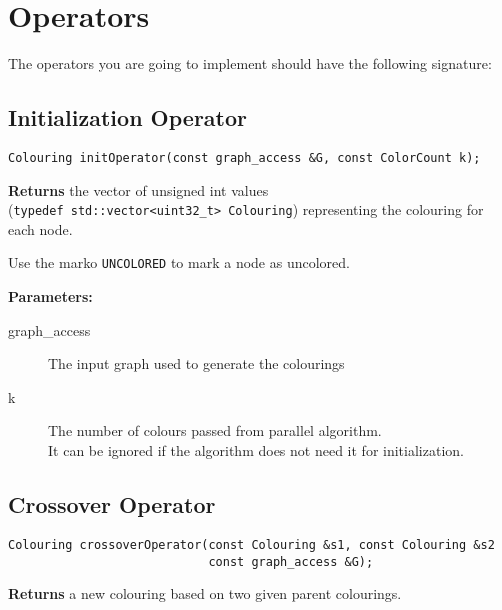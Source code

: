 \documentclass{scrartcl}
\begin{document}
\section{Operators}

The operators you are going to implement should have the following signature:

\subsection{Initialization Operator}

\renewcommand{\theFancyVerbLine}{\sffamily \textcolor[rgb]{0.5,0.5,1.0}{\normalsize \oldstylenums{\arabic{FancyVerbLine}}}}

\begin{verbatim}
Colouring initOperator(const graph_access &G, const ColorCount k);
\end{verbatim}

\textbf{Returns} the vector of unsigned int values \\ (\texttt{typedef std::vector<uint32_t> Colouring}) representing the colouring for each node.

Use the marko \texttt{UNCOLORED} to mark a node as uncolored.

\textbf{Parameters:}
\begin{description}
	\item[graph\_access] The input graph used to generate the colourings
	\item[k] The number of colours passed from parallel algorithm. \\
	It can be ignored if the algorithm does not need it for initialization.
\end{description}

\subsection{Crossover Operator}

\begin{verbatim}
Colouring crossoverOperator(const Colouring &s1, const Colouring &s2
                            const graph_access &G);
\end{verbatim}

\textbf{Returns} a new colouring based on two given parent colourings.
\end{document}

